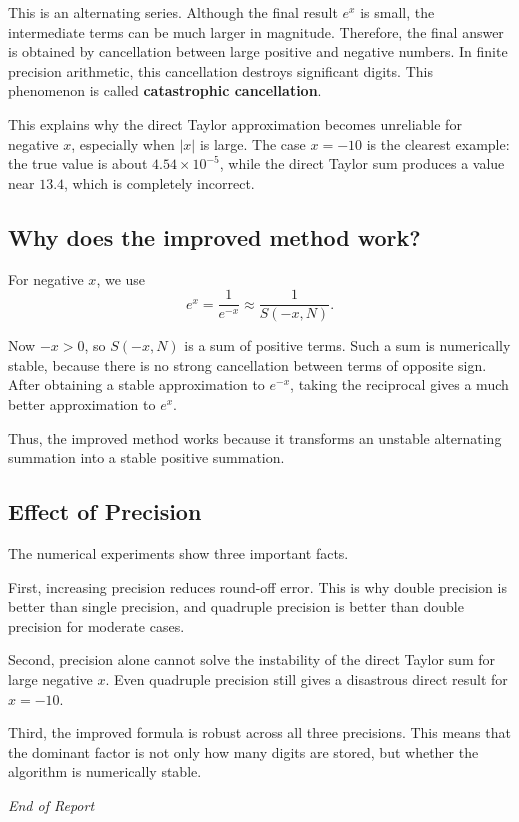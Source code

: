 \documentclass[12pt,a4paper]{article}
\begin{document}
This is an alternating series. Although the final result \(e^x\) is small, the intermediate terms can be much larger in magnitude. Therefore, the final answer is obtained by cancellation between large positive and negative numbers. In finite precision arithmetic, this cancellation destroys significant digits. This phenomenon is called \textbf{catastrophic cancellation}.

This explains why the direct Taylor approximation becomes unreliable for negative \(x\), especially when \(|x|\) is large. The case \(x=-10\) is the clearest example: the true value is about \(4.54\times 10^{-5}\), while the direct Taylor sum produces a value near \(13.4\), which is completely incorrect.

\subsection*{Why does the improved method work?}

For negative \(x\), we use
\[
e^x=\frac{1}{e^{-x}}\approx \frac{1}{S(-x,N)}.
\]

Now \(-x>0\), so \(S(-x,N)\) is a sum of positive terms. Such a sum is numerically stable, because there is no strong cancellation between terms of opposite sign. After obtaining a stable approximation to \(e^{-x}\), taking the reciprocal gives a much better approximation to \(e^x\).

Thus, the improved method works because it transforms an unstable alternating summation into a stable positive summation.

\subsection*{Effect of Precision}

The numerical experiments show three important facts.

First, increasing precision reduces round-off error. This is why double precision is better than single precision, and quadruple precision is better than double precision for moderate cases.

Second, precision alone cannot solve the instability of the direct Taylor sum for large negative \(x\). Even quadruple precision still gives a disastrous direct result for \(x=-10\).

Third, the improved formula is robust across all three precisions. This means that the dominant factor is not only how many digits are stored, but whether the algorithm is numerically stable.

\vfill
\begin{center}
    \textit{End of Report}
\end{center}
\end{document}
